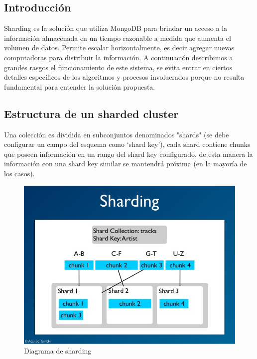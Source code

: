 \subsection{Introducción}

Sharding es la solución que utiliza MongoDB para brindar un acceso a la información almacenada en un tiempo razonable
a medida que aumenta el volumen de datos. 
Permite escalar horizontalmente, es decir agregar nuevas computadoras para distribuir la información.
A continuación describimos a grandes rasgos el funcionamiento de este sistema, se evita entrar en ciertos detalles
específicos de los algoritmos y procesos involucrados porque no resulta fundamental para entender la solución propuesta.\\

\subsection{Estructura de un sharded cluster}

Una colección es dividida en subconjuntos denominados "shards" (se debe configurar un campo del esquema como `shard key'), cada shard
contiene chunks que poseen información en un rango del shard key configurado, de esta manera la información con una shard key similar
se mantendrá próxima (en la mayoría de los casos). 

\begin{figure}[h!]
 \centering
 \includegraphics[scale=0.35,keepaspectratio=true]{./sharding.jpg}
 \caption{Diagrama de sharding}
\end{figure}

